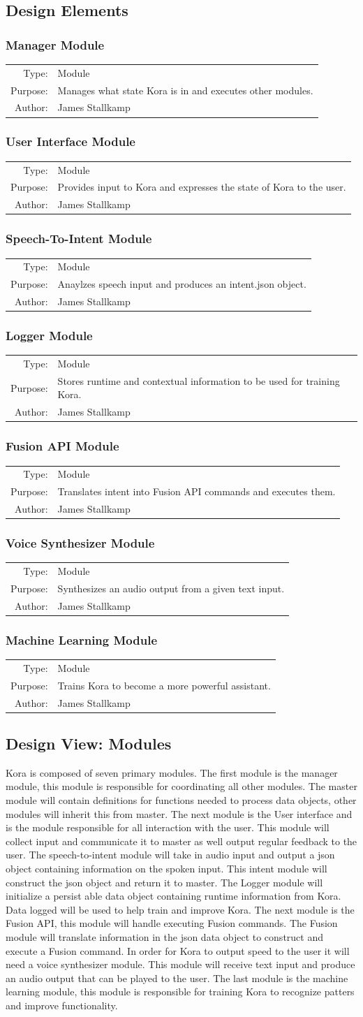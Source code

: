 \documentclass[onecolumn, draftclsnofoot,10pt, compsoc]{IEEEtran}
\def \botname{Kora\xspace}
\newcommand{\designElementDef}[4]{
    \subsubsection{#1}
    \begin{tabular}[t]{r p{6in}}
        Type: & #2 \\
        Purpose: & #3 \\
        Author: & #4 \\
    \end{tabular}
}
\begin{document}
    \subsection{Design Elements} 
        \designElementDef{Manager Module}
                         {Module}
                         {Manages what state \botname is in and executes other modules.}
                         {James Stallkamp}
        \designElementDef{User Interface Module}
                         {Module}
                         {Provides input to \botname and expresses the state of \botname to the user.}
                         {James Stallkamp}
        \designElementDef{Speech-To-Intent Module}
                         {Module}
                         {Anaylzes speech input and produces an intent.json object.}
                         {James Stallkamp}
        \designElementDef{Logger Module}
                         {Module}
                         {Stores runtime and contextual information to be used for training \botname.}
                         {James Stallkamp}
        \designElementDef{Fusion API Module}
                         {Module}
                         {Translates intent into Fusion API commands and executes them.}
                         {James Stallkamp}
        \designElementDef{Voice Synthesizer Module}
                         {Module}
                         {Synthesizes an audio output from a given text input.}
                         {James Stallkamp}
        \designElementDef{Machine Learning Module}
                         {Module}
                         {Trains \botname to become a more powerful assistant.}
                         {James Stallkamp}
    \subsection{Design View: Modules}
		\botname is composed of seven primary modules.
		The first module is the manager module, this module is responsible for coordinating all other modules.
		The master module will contain definitions for functions needed to process data objects, other modules will inherit this from master.
		The next module is the User interface and is the module responsible for all interaction with the user.
		This module will collect input and communicate it to master as well output regular feedback to the user.
		The speech-to-intent module will take in audio input and output a json object containing information on the spoken input.
		This intent module will construct the json object and return it to master.
		The Logger module will initialize a persist able data object containing runtime information from \botname.
		Data logged will be used to help train and improve \botname.
		The next module is the Fusion API, this module will handle executing Fusion commands.
		The Fusion module will translate information in the json data object to construct and execute a Fusion command.
		In order for \botname to output speed to the user it will need a voice synthesizer module.
		This module will receive text input and produce an audio output that can be played to the user.
		The last module is the machine learning module, this module is responsible for training \botname to recognize patters and improve functionality.
\end{document}
